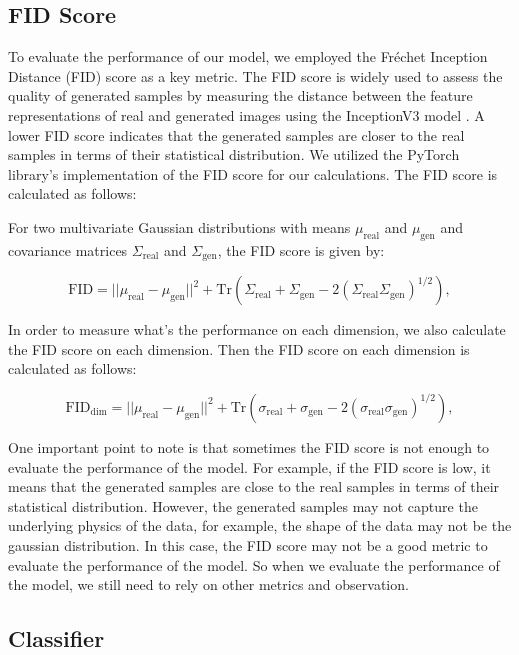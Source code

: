 \subsection{FID Score}
To evaluate the performance of our model, we employed the Fréchet Inception Distance (FID) score as a key metric. The FID score is widely used to assess the quality of generated samples by measuring the distance between the feature representations of real and generated images using the InceptionV3 model \cite{inceptionv3}. A lower FID score indicates that the generated samples are closer to the real samples in terms of their statistical distribution. We utilized the PyTorch library's implementation of the FID score \cite{pytorch} for our calculations. The FID score is calculated as follows:

For two multivariate Gaussian distributions with means $\mu_{\text{real}}$ and $\mu_{\text{gen}}$ and covariance matrices $\Sigma_{\text{real}}$ and $\Sigma_{\text{gen}}$, the FID score is given by:

\begin{equation}
    \text{FID} = ||\mu_{\text{real}} - \mu_{\text{gen}}||^2 + \text{Tr}(\Sigma_{\text{real}} + \Sigma_{\text{gen}} - 2(\Sigma_{\text{real}}\Sigma_{\text{gen}})^{1/2}),
\end{equation}

In order to measure what's the performance on each dimension, we also calculate the FID score on each dimension. Then the FID score on each dimension is calculated as follows:

\begin{equation}
    \text{FID}_{\text{dim}} = ||\mu_{\text{real}} - \mu_{\text{gen}}||^2 + \text{Tr}(\sigma_{\text{real}} + \sigma_{\text{gen}} - 2(\sigma_{\text{real}}\sigma_{\text{gen}})^{1/2}),
\end{equation}

One important point to note is that sometimes the FID score is not enough to evaluate the performance of the model. For example, if the FID score is low, it means that the generated samples are close to the real samples in terms of their statistical distribution. However, the generated samples may not capture the underlying physics of the data, for example, the shape of the data may not be the gaussian distribution. In this case, the FID score may not be a good metric to evaluate the performance of the model. So when we evaluate the performance of the model, we still need to rely on other metrics and observation.

\subsection{Classifier}


